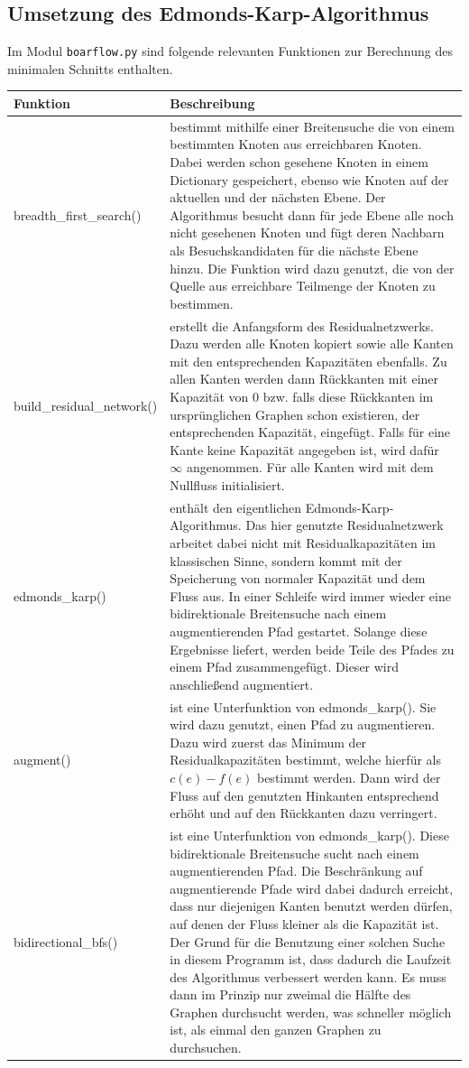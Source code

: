\documentclass[a4paper, notitlepage, 12pt]{scrartcl}
\begin{document}
 \subsection{Umsetzung des Edmonds-Karp-Algorithmus}
 Im Modul \texttt{boarflow.py} sind folgende relevanten Funktionen zur Berechnung des minimalen Schnitts enthalten.
 \begin{longtabu} to \linewidth {lX}
 Funktion & Beschreibung \\ \hline \hline \endhead
 breadth\_first\_search() & bestimmt mithilfe einer Breitensuche die von einem bestimmten Knoten aus erreichbaren Knoten. Dabei werden schon gesehene Knoten in einem Dictionary gespeichert, ebenso wie Knoten auf der aktuellen und der nächsten Ebene. Der Algorithmus besucht dann für jede Ebene alle noch nicht gesehenen Knoten und fügt deren Nachbarn als Besuchskandidaten für die nächste Ebene hinzu. Die Funktion wird dazu genutzt, die von der Quelle aus erreichbare Teilmenge der Knoten zu bestimmen.\\ \hline
 build\_residual\_network() & erstellt die Anfangsform des Residualnetzwerks. Dazu werden alle Knoten kopiert sowie alle Kanten mit den entsprechenden Kapazitäten ebenfalls. Zu allen Kanten werden dann Rückkanten mit einer Kapazität von 0 bzw. falls diese Rückkanten im ursprünglichen Graphen schon existieren, der entsprechenden Kapazität, eingefügt. Falls für eine Kante keine Kapazität angegeben ist, wird dafür $\infty$ angenommen. Für alle Kanten wird mit dem Nullfluss initialisiert. \\ \hline
 edmonds\_karp() & enthält den eigentlichen Edmonds-Karp-Algorithmus. Das hier genutzte Residualnetzwerk arbeitet dabei nicht mit Residualkapazitäten im klassischen Sinne, sondern kommt mit der Speicherung von normaler Kapazität und dem Fluss aus. In einer Schleife wird immer wieder eine bidirektionale Breitensuche nach einem augmentierenden Pfad gestartet. Solange diese Ergebnisse liefert, werden beide Teile des Pfades zu einem Pfad zusammengefügt. Dieser wird anschließend augmentiert.\\ \hline
 augment() & ist eine Unterfunktion von edmonds\_karp(). Sie wird dazu genutzt, einen Pfad zu augmentieren. Dazu wird zuerst das Minimum der Residualkapazitäten bestimmt, welche hierfür als $c(e) -f(e)$ bestimmt werden. Dann wird der Fluss auf den genutzten Hinkanten entsprechend erhöht und auf den Rückkanten dazu verringert. \\ \hline
 bidirectional\_bfs() & ist eine Unterfunktion von edmonds\_karp(). Diese bidirektionale Breitensuche sucht nach einem augmentierenden Pfad. Die Beschränkung auf augmentierende Pfade wird dabei dadurch erreicht, dass nur diejenigen Kanten benutzt werden  dürfen, auf denen der Fluss kleiner als die Kapazität ist. Der Grund für die Benutzung einer solchen Suche in diesem Programm ist, dass dadurch die Laufzeit des Algorithmus verbessert werden kann. Es muss dann im Prinzip nur zweimal die Hälfte des Graphen durchsucht werden, was schneller möglich ist, als einmal den ganzen Graphen zu durchsuchen.\\ \hline

\end{longtabu}
\end{document}
